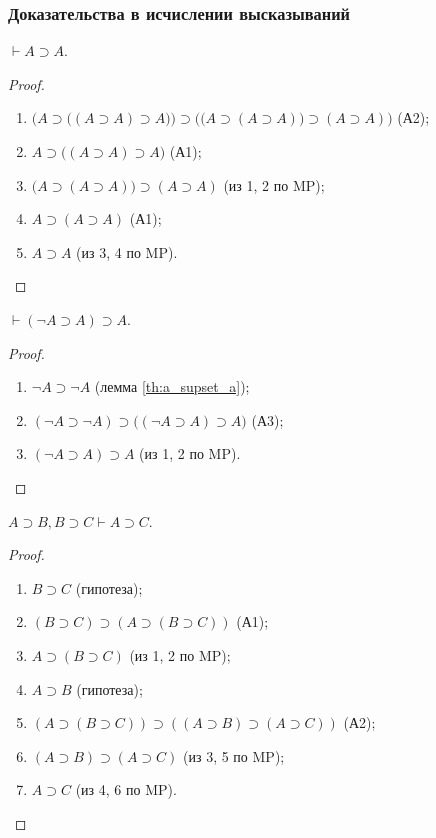 \subsubsection{Доказательства в исчислении высказываний}
\begin{lemma}\label{th:a_supset_a}
    $\vdash A \supset A$.
\end{lemma}
\begin{proof}\leavevmode
    \begin{enumerate}
        \item $\Big(A \supset \big((A \supset A) \supset A\big)\Big) \supset \Big(\big(A \supset (A \supset A)\big) \supset (A \supset A)\Big)$ (А2);
        \item $A \supset \big((A \supset A) \supset A\big)$ (А1);
        \item $\big(A \supset (A \supset A)\big) \supset (A \supset A)$ (из 1, 2 по MP);
        \item $A \supset (A \supset A)$ (А1);
        \item $A \supset A$ (из 3, 4 по MP).
    \end{enumerate}
\end{proof}
\begin{lemma}
    $\vdash (\neg A \supset A) \supset A$.
\end{lemma}
\begin{proof}\leavevmode
    \begin{enumerate}
        \item $\neg A \supset \neg A$ (лемма \ref{th:a_supset_a});
        \item $(\neg A \supset \neg A) \supset \big((\neg A \supset A) \supset A\big)$ (А3);
        \item $(\neg A \supset A) \supset A$ (из 1, 2 по MP).
    \end{enumerate}
\end{proof}
\begin{lemma}
    $A \supset B, B \supset C \vdash A \supset C$.
\end{lemma}
\begin{proof}\leavevmode
    \begin{enumerate}
        \item $B \supset C$ (гипотеза);
        \item $(B \supset C) \supset (A \supset (B \supset C))$ (А1);
        \item $A \supset (B \supset C)$ (из 1, 2 по MP);
        \item $A \supset B$ (гипотеза);
        \item $(A \supset (B \supset C)) \supset ((A \supset B) \supset (A \supset C))$ (А2);
        \item $(A \supset B) \supset (A \supset C)$ (из 3, 5 по MP);
        \item $A \supset C$ (из 4, 6 по MP).
    \end{enumerate}
\end{proof}
